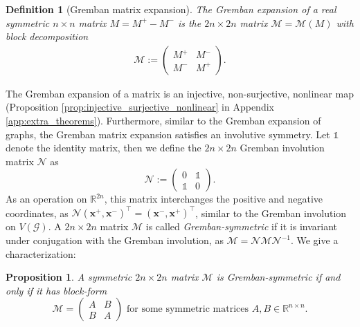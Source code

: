 \documentclass[reprint,onecolumn]{article}
\newtheorem{definition}[theorem]{Definition}  %
\newtheorem{proposition}[theorem]{Proposition}
\newcommand{\R}{\mathbb{R}}
\newcommand{\1}{\mathbb{1}}
\newcommand{\0}{\mathbf{0}}
\begin{document}
\begin{definition}[Gremban matrix expansion] The \emph{Gremban expansion} of a real symmetric $n\times n$ matrix $M=M^+-M^-$ is the $2n\times 2n$ matrix $\mathcal{M}=\mathcal{M}(M)$ with block decomposition
\begin{align}  \label{eq:gremban_expansion}
    \mathcal{M} := \begin{pmatrix}
M^+ & M^-\\M^-& M^+
\end{pmatrix}.
\end{align}    
\end{definition}
The Gremban expansion of a matrix is an injective, non-surjective, nonlinear map (Proposition \ref{prop:injective_surjective_nonlinear} in Appendix \ref{app:extra_theorems}). Furthermore, similar to the Gremban expansion of graphs, the Gremban matrix expansion satisfies an involutive symmetry. Let $\1$ denote the identity matrix, then we define the $2n\times2n$ Gremban involution matrix $\mathcal{N}$ as
$$
\mathcal{N} := \begin{pmatrix}
    0&\1\\\1&0
\end{pmatrix}.
$$
As an operation on $\R^{2n}$, this matrix interchanges the positive and negative coordinates, as $\mathcal{N}(\mathbf{x}^+,\mathbf{x}^-)^\top=(\mathbf{x}^-,\mathbf{x}^+)^\top$, similar to the Gremban involution on $V(\mathcal{G})$. A $2n\times 2n$ matrix $\mathcal{M}$ is called \emph{Gremban-symmetric} if it is invariant under conjugation with the Gremban involution, as $\mathcal{M}=\mathcal{N}\mathcal{M}\mathcal{N}^{-1}$. We give a characterization:

\begin{proposition}\label{prop: characterization Gremban-symmetric matrix}
A symmetric $2n\times 2n$ matrix $\mathcal{M}$ is Gremban-symmetric if and only if it has block-form
$$
\mathcal{M} = \begin{pmatrix}
    A&B\\B&A
\end{pmatrix} \text{~for some symmetric matrices $A,B\in\R^{n\times n}$}.
$$
\end{proposition}
\end{document}
